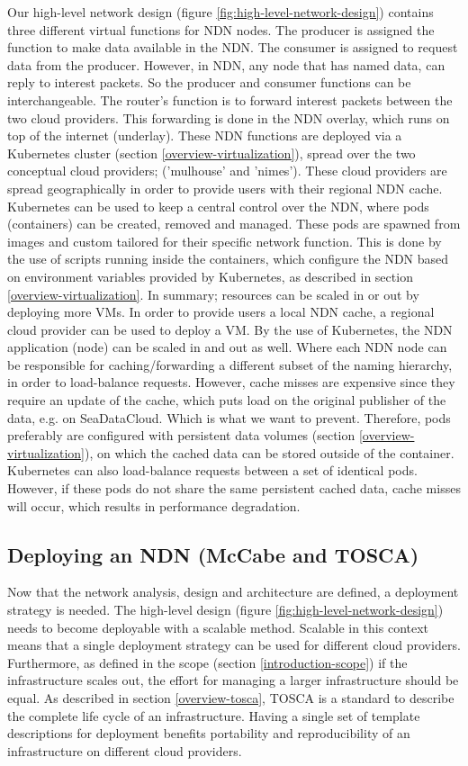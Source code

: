 Our high-level network design (figure \ref{fig:high-level-network-design}) contains three different virtual functions for NDN nodes. The producer is assigned the function to make data available in the NDN. The consumer is assigned to request data from the producer. However, in NDN, any node that has named data, can reply to interest packets. So the producer and consumer functions can be interchangeable. The router's function is to forward interest packets between the two cloud providers. This forwarding is done in the NDN overlay, which runs on top of the internet (underlay). These NDN functions are deployed via a Kubernetes cluster (section \ref{overview-virtualization}), spread over the two conceptual cloud providers; ('mulhouse' and 'nimes'). These cloud providers are spread geographically in order to provide users with their regional NDN cache. Kubernetes can be used to keep a central control over the NDN, where pods (containers) can be created, removed and managed. These pods are spawned from images and custom tailored for their specific network function. This is done by the use of scripts running inside the containers, which configure the NDN based on environment variables provided by Kubernetes, as described in section \ref{overview-virtualization}. In summary; resources can be scaled in or out by deploying more VMs. In order to provide users a local NDN cache, a regional cloud provider can be used to deploy a VM. By the use of Kubernetes, the NDN application (node) can be scaled in and out as well. Where each NDN node can be responsible for caching/forwarding a different subset of the naming hierarchy, in order to load-balance requests. However, cache misses are expensive since they require an update of the cache, which puts load on the original publisher of the data, e.g. on SeaDataCloud. Which is what we want to prevent. Therefore, pods preferably are configured with persistent data volumes (section \ref{overview-virtualization}), on which the cached data can be stored outside of the container. Kubernetes can also load-balance requests between a set of identical pods. However, if these pods do not share the same persistent cached data, cache misses will occur, which results in performance degradation.

\subsection{Deploying an NDN (McCabe and TOSCA)}
\label{planning-deploying}
Now that the network analysis, design and architecture are defined, a deployment strategy is needed. The high-level design (figure \ref{fig:high-level-network-design}) needs to become deployable with a scalable method. Scalable in this context means that a single deployment strategy can be used for different cloud providers. Furthermore, as defined in the scope (section \ref{introduction-scope}) if the infrastructure scales out, the effort for managing a larger infrastructure should be equal. As described in section \ref{overview-tosca}, TOSCA is a standard to describe the complete life cycle of an infrastructure. Having a single set of template descriptions for deployment benefits portability and reproducibility of an infrastructure on different cloud providers.

